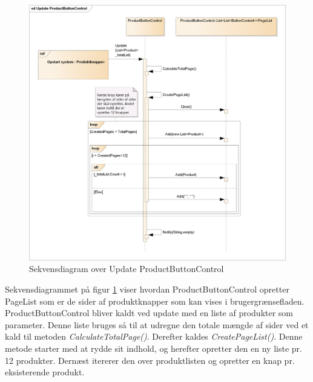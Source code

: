 \begin{figure}[H]
	\centering
	\includegraphics[width=1\textwidth]{Systemdesign/Frontend/GUI/DesignOgStruktur/Pics/UpdateProductButtonControl}
	\caption{Sekvensdiagram over Update ProductButtonControl}
	\label{fig:SekvensUpdatePBC}
\end{figure}

Sekvensdiagrammet på figur \ref{fig:SekvensUpdatePBC} viser hvordan ProductButtonControl opretter PageList som er de sider af produktknapper som kan vises i brugergrænsefladen. ProductButtonControl bliver kaldt ved update med en liste af produkter som parameter. Denne liste bruges så til at udregne den totale mængde af sider ved et kald til metoden \textit{CalculateTotalPage()}. Derefter kaldes \textit{CreatePageList()}. Denne metode starter med at rydde sit indhold, og herefter opretter den en ny liste pr. 12 produkter. Dernæst itererer den over produktlisten og opretter en knap pr. eksisterende produkt.

\newpage
